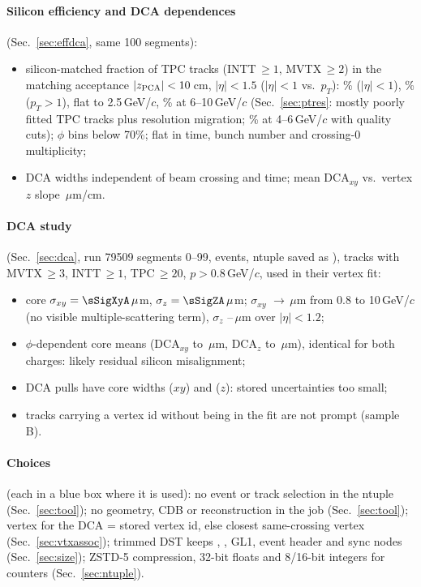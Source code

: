 \paragraph{Silicon efficiency and DCA dependences} (Sec.~\ref{sec:effdca}, same 100 segments):
\begin{itemize}\itemsep0pt
\item silicon-matched fraction of TPC tracks (INTT\,$\geq1$, MVTX\,$\geq2$) in the matching acceptance
  $|z_{\rm PCA}|<10$\,cm, $|\eta|<1.5$ ($|\eta|<1$ vs.\ $p_T$): \eEffAll\% ($|\eta|<1$), \eEffHi\% ($p_T>1$),
  flat to 2.5\,GeV/$c$, \eEffPtHigh\% at 6--10\,GeV/$c$ (Sec.~\ref{sec:ptres}: mostly poorly fitted TPC tracks plus
  resolution migration; \rEffQualFour\% at 4--6\,GeV/$c$ with quality cuts); \eLowPhiN{} $\phi$ bins below 70\%;
  flat in time, bunch number and crossing-0 multiplicity;
\item DCA widths independent of beam crossing and time; mean DCA$_{xy}$ vs.\ vertex $z$ slope \eSlopeXyVz\,$\mu$m/cm.
\end{itemize}

\paragraph{DCA study} (Sec.~\ref{sec:dca}, run 79509 segments 0--99, \sNEvents{} events, ntuple
saved as ), tracks with MVTX\,$\geq3$, INTT\,$\geq1$,
TPC\,$\geq20$, $p>0.8$\,GeV/$c$, used in their vertex fit:
\begin{itemize}\itemsep0pt
\item core $\sigma_{xy}=\sSigXyA\,\mu$m, $\sigma_z=\sSigZA\,\mu$m; $\sigma_{xy}$ \sSigXyAlowP$\to$\sSigXyAhighP\,$\mu$m
  from 0.8 to 10\,GeV/$c$ (no visible multiple-scattering term), $\sigma_z$ \sSigZEtaMin--\sSigZEtaMax\,$\mu$m over $|\eta|<1.2$;
\item $\phi$-dependent core means (DCA$_{xy}$ \sMeanXyPhiMin{} to \sMeanXyPhiMax\,$\mu$m, DCA$_z$ \sMeanZPhiMin{} to
  \sMeanZPhiMax\,$\mu$m), identical for both charges: likely residual silicon misalignment;
\item DCA pulls have core widths \sPullXyA{} ($xy$) and \sPullZA{} ($z$): stored uncertainties too small;
\item tracks carrying a vertex id without being in the fit are not prompt (sample B).
\end{itemize}

\paragraph{Choices} (each in a blue box where it is used):
no event or track selection in the ntuple (Sec.~\ref{sec:tool});
no geometry, CDB or reconstruction in the job (Sec.~\ref{sec:tool});
vertex for the DCA = stored vertex id, else closest same-crossing vertex (Sec.~\ref{sec:vtxassoc});
trimmed DST keeps , , GL1, event header and sync nodes
(Sec.~\ref{sec:size}); ZSTD-5 compression, 32-bit floats and 8/16-bit integers for counters
(Sec.~\ref{sec:ntuple}).
